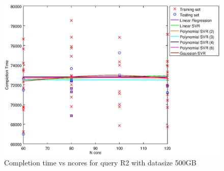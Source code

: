 
\begin {figure}[hbtp]
\centering
\includegraphics[width=\textwidth]{output/R2_500_LINEAR_NCORE/plot_R2_500.eps}
\caption{Completion time vs ncores for query R2 with datasize 500GB}
\label{fig:coreonly_linear_R2_500}
\end {figure}
